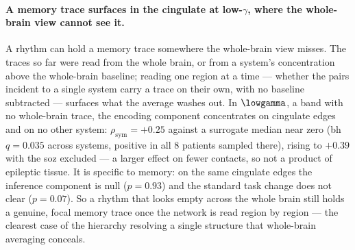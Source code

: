 \paragraph{A memory trace surfaces in the cingulate at low-\(\gamma\), where the whole-brain view cannot see it.}
A rhythm can hold a memory trace somewhere the whole-brain view misses. The traces so far were read from the whole brain, or from a system's concentration above the whole-brain baseline; reading one region at a time --- whether the pairs incident to a single system carry a trace on their own, with no baseline subtracted --- surfaces what the average washes out. In \(\lowgamma\), a band with no whole-brain trace, the encoding component concentrates on cingulate edges and on no other system: \(\rho_{\mathrm{sym}} = {+}0.25\) against a surrogate median near zero (\gls{bh} \(q = 0.035\) across systems, positive in all \(8\) patients sampled there), rising to \({+}0.39\) with the \gls{soz} excluded --- a larger effect on fewer contacts, so not a product of epileptic tissue. It is specific to memory: on the same cingulate edges the inference component is null (\(p = 0.93\)) and the standard task change does not clear (\(p = 0.07\)). So a rhythm that looks empty across the whole brain still holds a genuine, focal memory trace once the network is read region by region --- the clearest case of the hierarchy resolving a single structure that whole-brain averaging conceals.
